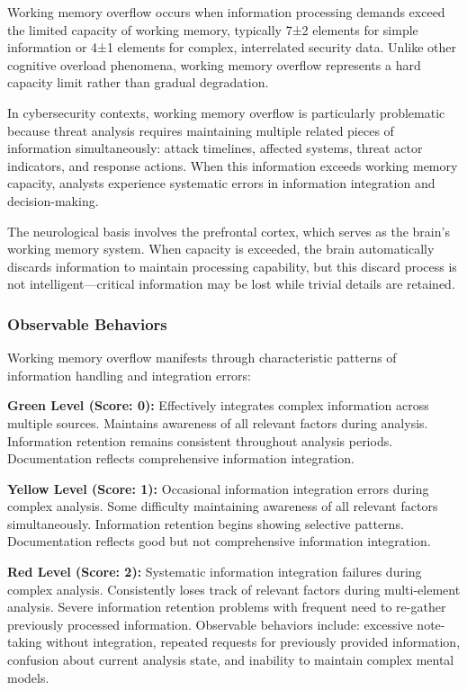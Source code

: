 \documentclass[11pt,a4paper]{article}
\begin{document}
Working memory overflow occurs when information processing demands exceed the limited capacity of working memory, typically 7±2 elements for simple information or 4±1 elements for complex, interrelated security data\cite{cowan2001}. Unlike other cognitive overload phenomena, working memory overflow represents a hard capacity limit rather than gradual degradation.

In cybersecurity contexts, working memory overflow is particularly problematic because threat analysis requires maintaining multiple related pieces of information simultaneously: attack timelines, affected systems, threat actor indicators, and response actions. When this information exceeds working memory capacity, analysts experience systematic errors in information integration and decision-making.

The neurological basis involves the prefrontal cortex, which serves as the brain's working memory system\cite{goldman-rakic1995}. When capacity is exceeded, the brain automatically discards information to maintain processing capability, but this discard process is not intelligent---critical information may be lost while trivial details are retained.

\subsubsection{Observable Behaviors}

Working memory overflow manifests through characteristic patterns of information handling and integration errors:

\textbf{Green Level (Score: 0):} Effectively integrates complex information across multiple sources. Maintains awareness of all relevant factors during analysis. Information retention remains consistent throughout analysis periods. Documentation reflects comprehensive information integration.

\textbf{Yellow Level (Score: 1):} Occasional information integration errors during complex analysis. Some difficulty maintaining awareness of all relevant factors simultaneously. Information retention begins showing selective patterns. Documentation reflects good but not comprehensive information integration.

\textbf{Red Level (Score: 2):} Systematic information integration failures during complex analysis. Consistently loses track of relevant factors during multi-element analysis. Severe information retention problems with frequent need to re-gather previously processed information. Observable behaviors include: excessive note-taking without integration, repeated requests for previously provided information, confusion about current analysis state, and inability to maintain complex mental models.
\end{document}
